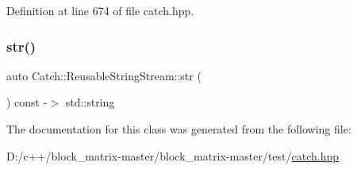 Definition at line 674 of file catch.\+hpp.

\mbox{\label{class_catch_1_1_reusable_string_stream_a0e9ecf260b2a5d35f4886ef0d51f6270}} 
\subsubsection{\texorpdfstring{str()}{str()}}
{\footnotesize\ttfamily auto Catch\+::\+Reusable\+String\+Stream\+::str (\begin{DoxyParamCaption}{ }\end{DoxyParamCaption}) const -\/$>$  std\+::string}



The documentation for this class was generated from the following file\+:\begin{DoxyCompactItemize}
\item 
D\+:/c++/block\+\_\+matrix-\/master/block\+\_\+matrix-\/master/test/\mbox{\hyperlink{catch_8hpp}{catch.\+hpp}}\end{DoxyCompactItemize}
